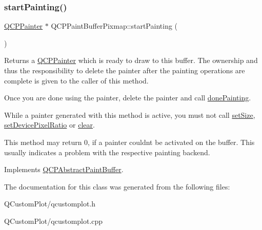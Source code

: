 \subsubsection{\texorpdfstring{start\+Painting()}{startPainting()}}
{\footnotesize\ttfamily \mbox{\hyperlink{class_q_c_p_painter}{Q\+C\+P\+Painter}} $\ast$ Q\+C\+P\+Paint\+Buffer\+Pixmap\+::start\+Painting (\begin{DoxyParamCaption}{ }\end{DoxyParamCaption})\hspace{0.3cm}{\ttfamily [virtual]}}

Returns a \mbox{\hyperlink{class_q_c_p_painter}{Q\+C\+P\+Painter}} which is ready to draw to this buffer. The ownership and thus the responsibility to delete the painter after the painting operations are complete is given to the caller of this method.

Once you are done using the painter, delete the painter and call \mbox{\hyperlink{class_q_c_p_abstract_paint_buffer_a41b0dc6e7744f19fae09f8532c207dc1}{done\+Painting}}.

While a painter generated with this method is active, you must not call \mbox{\hyperlink{class_q_c_p_abstract_paint_buffer_a8b68c3cd36533f1a4a23b5ce8cd66f01}{set\+Size}}, \mbox{\hyperlink{class_q_c_p_abstract_paint_buffer_a555eaad5d5c806420ff35602a1bb68fa}{set\+Device\+Pixel\+Ratio}} or \mbox{\hyperlink{class_q_c_p_paint_buffer_pixmap_a14badbd010a3cde6b55817ccb7b65217}{clear}}.

This method may return 0, if a painter couldn\textquotesingle{}t be activated on the buffer. This usually indicates a problem with the respective painting backend. 

Implements \mbox{\hyperlink{class_q_c_p_abstract_paint_buffer_a9e9f29b19c033cf02fb96f1a148463f3}{Q\+C\+P\+Abstract\+Paint\+Buffer}}.



The documentation for this class was generated from the following files\+:\begin{DoxyCompactItemize}
\item 
Q\+Custom\+Plot/qcustomplot.\+h\item 
Q\+Custom\+Plot/qcustomplot.\+cpp\end{DoxyCompactItemize}
